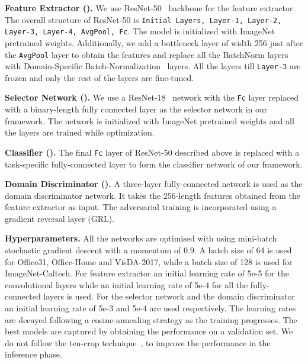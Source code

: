 \documentclass[10pt,twocolumn,letterpaper]{article}
\begin{document}
\vspace{1mm}
\noindent
\textbf{Feature Extractor ().} We use ResNet-50~\cite{he2016deep} backbone for the feature extractor. The overall structure of ResNet-50 is \texttt{Initial Layers, Layer-1, Layer-2, Layer-3, Layer-4, AvgPool, Fc}. The model is initialized with ImageNet~\cite{russakovsky2015imagenet} pretrained weights. Additionally, we add a bottleneck layer of width 256 just after the \texttt{AvgPool} layer to obtain the features and replace all the BatchNorm layers with Domain-Specific Batch-Normalization~\cite{chang2019domain} layers. All the layers till \texttt{Layer-3} are frozen and only the rest of the layers are fine-tuned.

\vspace{1mm}
\noindent\textbf{Selector Network ().} We use a ResNet-18~\cite{he2016deep} network with the \texttt{Fc} layer replaced with a binary-length fully connected layer as the selector network in our framework. The network is initialized with ImageNet pretrained weights and all the layers are trained while optimization. 

\vspace{1mm}
\noindent\textbf{Classifier ().} The final \texttt{Fc} layer of ResNet-50 described above is replaced with a task-specific fully-connected layer to form the classifier network of our framework.

\vspace{1mm}
\noindent\textbf{Domain Discriminator ().} A three-layer fully-connected network is used as the domain discriminator network. It takes the 256-length features obtained from the feature extractor as input. The adversarial training is incorporated using a gradient reversal layer (GRL).

\vspace{1mm}
\noindent\textbf{Hyperparameters.}
All the networks are optimised with using mini-batch stochastic gradient descent with a momentum of 0.9. A batch size of 64 is used for Office31, Office-Home and VisDA-2017, while a batch size of 128 is used for ImageNet-Caltech. For feature extractor an initial learning rate of 5e-5 for the convolutional layers while an initial learning rate of 5e-4 for all the fully-connected layers is used. For the selector network and the domain discriminator an initial learning rate of 5e-3 and 5e-4 are used respectively. The learning rates are decayed following a cosine-annealing strategy as the training progresses. The best models are captured by obtaining the performance on a validation set. We do not follow the ten-crop technique~\cite{cao2018partialpada, cao2019learning}, to improve the performance in the inference phase. 
\end{document}

